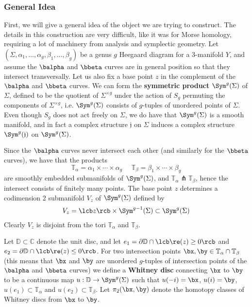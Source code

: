 \subsubsection*{General Idea}

First, we will give a general idea of the object we are trying to construct. The details in this construction are very difficult, like it was for Morse homology, requiring a lot of machinery from analysis and symplectic geometry. Let $(\Sigma,\alpha_1,\ldots,\alpha_g,\beta_1,\ldots,\beta_g)$ be a genus $g$ Heegaard diagram for a 3-manifold $Y$, and assume the $\balpha$ and $\bbeta$ curves are in general position so that they intersect transversally. Let us also fix a base point $z$ in the complement of the $\balpha$ and $\bbeta$ curves. We can form the \textbf{symmetric product} $\Sym^g(\Sigma)$ of $\Sigma$, defined to be the quotient of $\Sigma^{\times g}$ under the action of $S_g$ permuting the components of $\Sigma^{\times g}$, i.e. $\Sym^g(\Sigma)$ consists of $g$-tuples of unordered points of $\Sigma$. Even though $S_g$ does not act freely on $\Sigma$, we do have that $\Sym^g(\Sigma)$ is a smooth manifold, and in fact a complex structure $\mathfrak j$ on $\Sigma$ induces a complex structure $\Sym^g(\mathfrak j)$ on $\Sym^g(\Sigma)$. 

Since the $\balpha$ curves never intersect each other (and similarly for the $\bbeta$ curves), we have that the products
\[ \mathbb T_\alpha = \alpha_1 \times \cdots \times \alpha_g \ \ \ \ \ \ \mathbb T_\beta = \beta_1 \times \cdots \times \beta_g \]
are smoothly embedded submanifolds of $\Sym^g(\Sigma)$, and $\mathbb T_\alpha \pitchfork \mathbb T_\beta$, hence the intersect consists of finitely many points. The base point $z$ determines a codimension 2 submanifold $V_z$ of $\Sym^g(\Sigma)$ defined by
\[ V_z = \lcb z \rcb \times \Sym^{g-1}(\Sigma) \subset \Sym^g(\Sigma) \]
Clearly $V_z$ is disjoint from the tori $\mathbb T_\alpha$ and $\mathbb T_\beta$. 

Let $\mathbb D \subset \mathbb C$ denote the unit disc, and let $e_1 = \partial\mathbb D \cap \lcb \re(z) \geq 0 \rcb$ and $e_2 = \partial\mathbb D \cap \lcb \re(z) \leq 0 \rcb$. For two intersection points $\bx,\by \in \mathbb T_\alpha \cap \mathbb T_\beta$ (this means that $\bx$ and $\by$ are unordered $g$-tuples of intersection points of the $\balpha$ and $\bbeta$ curves) we define a \textbf{Whitney disc} connecting $\bx$ to $\by$ to be a continuous map $u : \mathbb D \rightarrow \Sym^g(\Sigma)$ such that $u(-i)=\bx$, $u(i)=\by$, $u(e_1) \subset \mathbb T_\alpha$ and $u(e_2) \subset \mathbb T_\beta$. Let $\pi_2(\bx,\by)$ denote the homotopy classes of Whitney discs from $\bx$ to $\by$.

